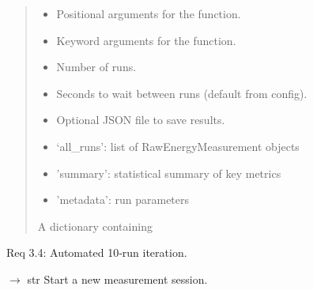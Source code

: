 \documentclass[letterpaper,10pt,english]{sphinxmanual}
\begin{document}
\begin{fulllineitems}
\begin{fulllineitems}
\begin{quote}
\begin{description}
\begin{itemize}
\item {} 
\sphinxAtStartPar
{} \textendash{} Positional arguments for the function.

\item {} 
\sphinxAtStartPar
{} \textendash{} Keyword arguments for the function.

\item {} 
\sphinxAtStartPar
{} \textendash{} Number of runs.

\item {} 
\sphinxAtStartPar
{} \textendash{} Seconds to wait between runs (default from config).

\item {} 
\sphinxAtStartPar
{} \textendash{} Optional JSON file to save results.

\end{itemize}

\sphinxAtStartPar
\begin{itemize}
\item {} 
\sphinxAtStartPar
‘all\_runs’: list of RawEnergyMeasurement objects

\item {} 
\sphinxAtStartPar
’summary’: statistical summary of key metrics

\item {} 
\sphinxAtStartPar
’metadata’: run parameters

\end{itemize}


\sphinxAtStartPar
A dictionary containing

\end{description}\end{quote}

\sphinxAtStartPar
Req 3.4: Automated 10‑run iteration.

\end{fulllineitems}


\begin{fulllineitems}
\label{\detokenize{core.energy_engine:core.energy_engine.EnergyEngine.start_measurement}}
\pysigstartsignatures
\pysiglinewithargsret
{}
{}
{{ $\rightarrow$ str}}
\pysigstopsignatures
\sphinxAtStartPar
Start a new measurement session.


\end{fulllineitems}
\end{fulllineitems}
\end{document}
